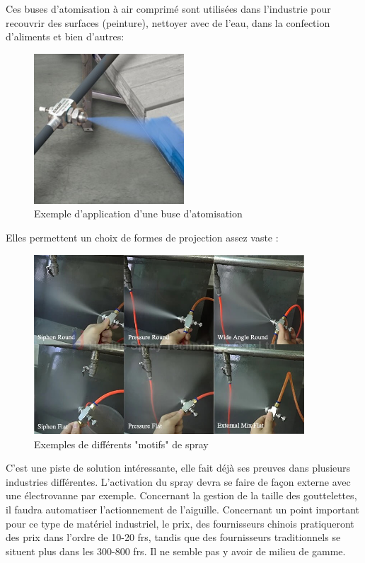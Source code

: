 Ces buses d'atomisation à air comprimé sont utilisées dans l'industrie pour recouvrir des surfaces (peinture), nettoyer avec de l'eau, dans la confection d'aliments et bien d'autres:
\begin{figure}[H]
    \centering
    \includegraphics[width=0.5\textwidth]{assets/figures/etat_art/buse spray.jpeg}
    \caption[Exemple d'application d'une buse d'atomisation]{Exemple d'application d'une buse d'atomisation \autocite{exemple_application_buse}\footnotemark}
\end{figure}
\newpage
Elles permettent un choix de formes de projection assez vaste :
\begin{figure}[H]
    \centering
    \includegraphics[width=0.9\textwidth]{assets/figures/etat_art/spray_patterns_example.jpeg}
    \caption[Exemples de différents "motifs" de spray]{Exemples de différents "motifs" de spray \autocite{Exemples_spray_patterns}\footnotemark}
\end{figure}
C'est une piste de solution intéressante, elle fait déjà ses preuves dans plusieurs industries différentes.
L'activation du spray devra se faire de façon externe avec une électrovanne par exemple. Concernant la gestion de la taille
des gouttelettes, il faudra automatiser l'actionnement de l'aiguille. Concernant un point important pour ce type de matériel industriel, le prix,
des fournisseurs chinois pratiqueront des prix dans l'ordre de 10-20 frs, tandis que des fournisseurs traditionnels se situent plus dans les 300-800 frs. Il ne semble
pas y avoir de milieu de gamme.

